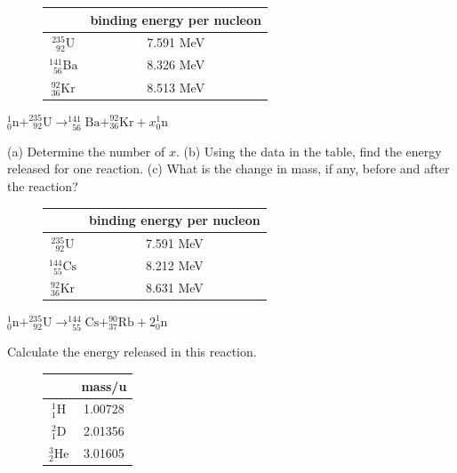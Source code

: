 \documentclass[a4paper,12pt]{book}
\renewenvironment{marginfigure}[1][]{\begin{figure}[htbp]\centering}{\end{figure}}
\begin{document}
\begin{marginfigure}
	\begin{tabular}{|c|c|}
		\hline
		& binding energy per nucleon \\ \hline
		\rule[-1em]{0pt}{3em}$^{235}_{\phantom{2}92}\text{U}$ & 7.591 MeV \\ \hline \rule[-1em]{0pt}{3em}$^{141}_{\phantom{1}56}\text{Ba}$ & 8.326 MeV\\ \hline \rule[-1em]{0pt}{3em}$^{92}_{36}\text{Kr}$ & 8.513 MeV\\ \hline
	\end{tabular}
\end{marginfigure}

	
{

\centering

$^1_0\text{n} + ^{235}_{\phantom{2}92}\text{U} \longrightarrow ^{141}_{\phantom{1}56}\text{Ba} + ^{92}_{36}\text{Kr} + x^1_0\text{n}$

}

\noindent (a) Determine the number of $x$. (b) Using the data in the table, find the energy released for one reaction. (c) What is the change in mass, if any, before and after the reaction?

\begin{marginfigure}
	\flushright
	\begin{tabular}{|c|c|}
		\hline
		& binding energy per nucleon \\ \hline
		\rule[-1em]{0pt}{3em}$^{235}_{\phantom{2}92}\text{U}$ & 7.591 MeV \\ \hline \rule[-1em]{0pt}{3em}$^{144}_{\phantom{1}55}\text{Cs}$ & 8.212 MeV\\ \hline \rule[-1em]{0pt}{3em}$^{92}_{36}\text{Kr}$ & 8.631 MeV\\ \hline
	\end{tabular}
\end{marginfigure}

{
	
	\centering
	
	$^1_0\text{n} + ^{235}_{\phantom{2}92}\text{U} \longrightarrow ^{144}_{\phantom{1}55}\text{Cs} + ^{90}_{37}\text{Rb} + 2^1_0\text{n}$	
	
}

\noindent Calculate the energy released in this reaction.

\begin{marginfigure}
	\vspace*{-21pt}
	\flushright
	\begin{tabular}{|c|c|}
		\hline
		& mass/u \\ \hline
		\rule[-1em]{0pt}{3em}$^1_1\text{H}$ & 1.00728 \\ \hline
		\rule[-1em]{0pt}{3em}$^2_1\text{D}$ & 2.01356 \\ \hline 
		\rule[-1em]{0pt}{3em}$^3_2\text{He}$ & 3.01605 \\ \hline
	\end{tabular}
	\vspace*{-10pt}
\end{marginfigure}
\end{document}
